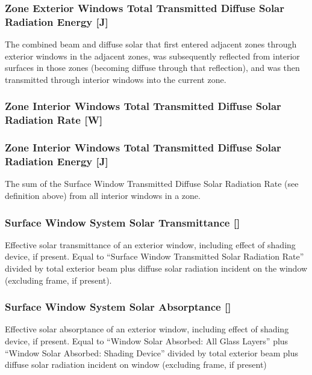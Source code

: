 \subsubsection{Zone Exterior Windows Total Transmitted Diffuse Solar Radiation Energy {[}J{]}}\label{zone-exterior-windows-total-transmitted-diffuse-solar-radiation-energy-j}

The combined beam and diffuse solar that first entered adjacent zones through exterior windows in the adjacent zones, was subsequently reflected from interior surfaces in those zones (becoming diffuse through that reflection), and was then transmitted through interior windows into the current zone.

\subsubsection{Zone Interior Windows Total Transmitted Diffuse Solar Radiation Rate {[}W{]}}\label{zone-interior-windows-total-transmitted-diffuse-solar-radiation-rate-w}

\subsubsection{Zone Interior Windows Total Transmitted Diffuse Solar Radiation Energy {[}J{]}}\label{zone-interior-windows-total-transmitted-diffuse-solar-radiation-energy-j}

The sum of the Surface Window Transmitted Diffuse Solar Radiation Rate (see definition above) from all interior windows in a zone.

\subsubsection{Surface Window System Solar Transmittance {[]}}\label{surface-window-system-solar-transmittance}

Effective solar transmittance of an exterior window, including effect of shading device, if present. Equal to ``Surface Window Transmitted Solar Radiation Rate'' divided by total exterior beam plus diffuse solar radiation incident on the window (excluding frame, if present).

\subsubsection{Surface Window System Solar Absorptance {[]}}\label{surface-window-system-solar-absorptance}

Effective solar absorptance of an exterior window, including effect of shading device, if present. Equal to ``Window Solar Absorbed: All Glass Layers'' plus ``Window Solar Absorbed: Shading Device'' divided by total exterior beam plus diffuse solar radiation incident on window (excluding frame, if present)

